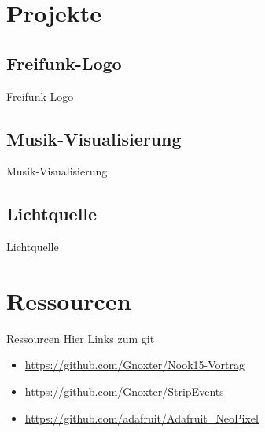 \documentclass{beamer}
\begin{document}
\section{Projekte}
\subsection{Freifunk-Logo}
\begin{frame}{Freifunk-Logo}
\end{frame}

\subsection{Musik-Visualisierung}
\begin{frame}{Musik-Visualisierung}
\end{frame}

\subsection{Lichtquelle}
\begin{frame}{Lichtquelle}
\end{frame}

\section{Ressourcen}
\begin{frame}{Ressourcen}
 Hier Links zum git
\begin{itemize}
 \item \url{https://github.com/Gnoxter/Nook15-Vortrag}
 \item \url{https://github.com/Gnoxter/StripEvents}
 \item \url{https://github.com/adafruit/Adafruit_NeoPixel}
\end{itemize}
\end{frame}
\end{document}
